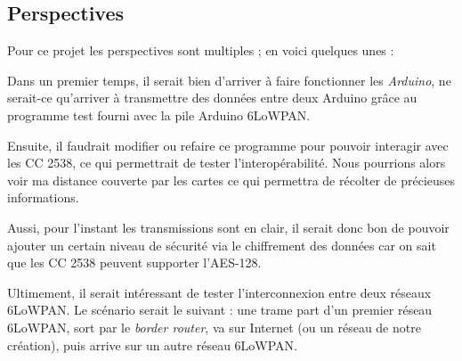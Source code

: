 
\subsection{Perspectives}

Pour ce projet les perspectives sont multiples ; en voici quelques unes :

Dans un premier temps, il serait bien d'arriver à faire fonctionner les \emph{Arduino}, ne serait-ce qu'arriver à transmettre des données entre deux Arduino grâce au programme test fourni avec la pile Arduino 6LoWPAN.

Ensuite, il faudrait modifier ou refaire ce programme pour pouvoir interagir avec les CC 2538, ce qui permettrait de tester l'interopérabilité. Nous pourrions alors voir ma distance couverte par les cartes ce qui permettra de récolter de précieuses informations.

Aussi, pour l'instant les transmissions sont en clair, il serait donc bon de pouvoir ajouter un certain niveau de sécurité via le chiffrement des données car on sait que les CC 2538 peuvent supporter l'AES-128.

Ultimement, il serait intéressant de tester l'interconnexion entre deux réseaux 6LoWPAN. Le scénario serait le suivant : une trame part d'un premier réseau 6LoWPAN, sort par le \textit{border router}, va sur Internet (ou un réseau de notre création), puis arrive sur un autre réseau 6LoWPAN.
